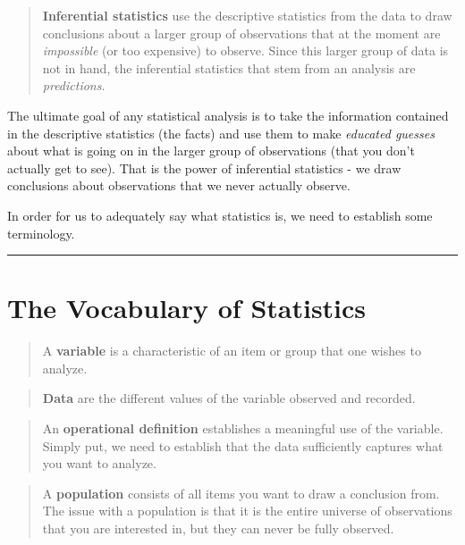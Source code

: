 \documentclass[
]{book}
\begin{document}
\begin{quote}
\textbf{Inferential statistics} use the descriptive statistics from the data to draw conclusions about a larger group of observations that at the moment are \emph{impossible} (or too expensive) to observe. Since this larger group of data is not in hand, the inferential statistics that stem from an analysis are \emph{predictions}.
\end{quote}

The ultimate goal of any statistical analysis is to take the information contained in the descriptive statistics (the facts) and use them to make \emph{educated guesses} about what is going on in the larger group of observations (that you don't actually get to see). That is the power of inferential statistics - we draw conclusions about observations that we never actually observe.

In order for us to adequately say what statistics is, we need to establish some terminology.

\begin{center}\rule{0.5\linewidth}{0.5pt}\end{center}

\section{The Vocabulary of Statistics}\label{the-vocabulary-of-statistics}

\begin{quote}
A \textbf{variable} is a characteristic of an item or group that one wishes to analyze.
\end{quote}

\begin{quote}
\textbf{Data} are the different values of the variable observed and recorded.
\end{quote}

\begin{quote}
An \textbf{operational definition} establishes a meaningful use of the variable. Simply put, we need to establish that the data sufficiently captures what you want to analyze.
\end{quote}

\begin{quote}
A \textbf{population} consists of all items you want to draw a conclusion from. The issue with a population is that it is the entire universe of observations that you are interested in, but they can never be fully observed.
\end{quote}
\end{document}
